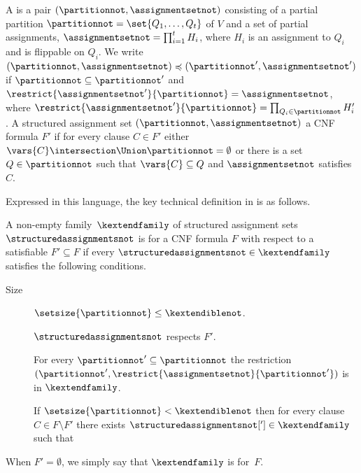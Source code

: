 A  is a pair
$(\partitionnot, \assignmentsetnot)$ 
consisting of a partial partition $\partitionnot =
\set{Q_1, \ldots, Q_t}$ of $V$ and a set of 
partial assignments, %
$\assignmentsetnot = \prod_{i = 1}^t H_i$, where
%
%
$H_i$ is an assignment to $Q_i$ and is flippable on $Q_i$.  %
%
%
%
%
We write $(\partitionnot, \assignmentsetnot) \preccurlyeq
(\partitionnot', \assignmentsetnot')$ if $\partitionnot \subseteq \partitionnot'$
and $\restrict{\assignmentsetnot'}{\partitionnot} = \assignmentsetnot$, where
$\restrict{\assignmentsetnot'}{\partitionnot} = \prod_{Q_i \in \partitionnot} H'_i$. 
A structured assignment set $(\partitionnot, \assignmentsetnot)$
 a CNF formula $F'$ if for every clause $C \in
F'$ either $\vars{C}\intersection \Union \partitionnot=\emptyset$ or
there is a set $Q \in \partitionnot$ such that $\vars{C}\subseteq Q$ and
$\assignmentsetnot$ satisfies $C$.

Expressed in this language, the key technical definition in 
\cite{BG15Framework}
is as follows.

\begin{definition}
  \label{def:k-extendible}
  A non-empty family~$\kextendfamily$ of structured assignment sets
  $\structuredassignmentsnot$ is \introduceterm{\kextendible{}} for a CNF
  formula $F$ with respect 
  to a satisfiable $F' \subseteq F$ 
%
%
%
  if every $\structuredassignmentsnot \in \kextendfamily$
  satisfies the following conditions.
  \begin{description}
  \item[Size]%
%
    $\setsize{\partitionnot} \leq \kextendiblenot$.
  \item[\Respectfulness{}]
%
    $\structuredassignmentsnot$ respects $F'$.
  \item[\Restrictionpropname{}] 
%
    For every $\partitionnot' \subseteq \partitionnot$ the restriction
    $(\partitionnot', \restrict{\assignmentsetnot}{\partitionnot'})$ is in
    $\kextendfamily$.
  \item[\Extensionpropname{}]
%
    If $\setsize{\partitionnot} < \kextendiblenot$ then for every
    clause $C \in F\setminus F'$ there exists
    $\structuredassignmentsnot['] \in \kextendfamily$ such that 
  \end{description}
%
  When $F' = \emptyset$, we simply say that $\kextendfamily$
    is \kextendible for~$F$.
%
%
%
%
%
%
%
%
%
%
%
%
%
%
%
%
%
%
%
%
%

\end{definition}

